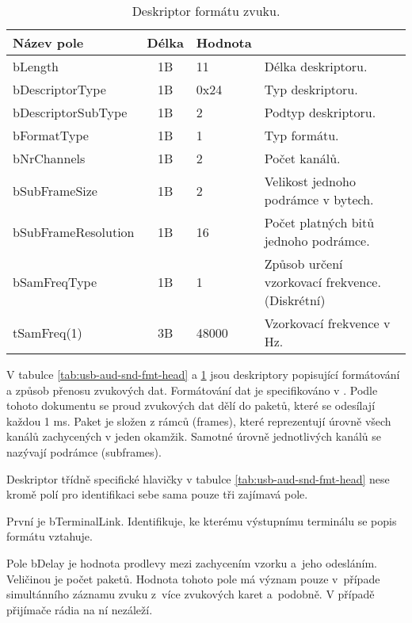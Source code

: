 \begin{table}[ht!]
\begin{center}
\begin{tabular}{|l|c|l|l|}
\hline 
Název pole & Délka & Hodnota &  \\ 
\hline
bLength & 1B & 11 & Délka deskriptoru.\\
\hline
bDescriptorType & 1B & 0x24 & Typ deskriptoru. \\
\hline
bDescriptorSubType & 1B & 2 & Podtyp deskriptoru. \\
\hline
bFormatType & 1B & 1 & Typ formátu.\\
\hline
bNrChannels & 1B & 2 & Počet kanálů.\\
\hline
bSubFrameSize & 1B & 2 & Velikost jednoho podrámce v bytech. \\ %
\hline
bSubFrameResolution & 1B & 16 & Počet platných bitů jednoho podrámce. \\
\hline 
bSamFreqType & 1B & 1 & Způsob určení vzorkovací frekvence. (Diskrétní) \\ %
\hline
tSamFreq(1) & 3B & 48000 & Vzorkovací frekvence v Hz. \\
\hline 
\end{tabular} 
\end{center}
\caption{Deskriptor formátu zvuku.}
\label{tab:usb-aud-snd-fmt} 
\end{table}

\FloatBarrier

V tabulce \ref{tab:usb-aud-snd-fmt-head} a \ref{tab:usb-aud-snd-fmt} jsou deskriptory popisující formátování a způsob přenosu zvukových dat. Formátování dat je specifikováno v \cite{usb-audio-formats}. Podle tohoto dokumentu se proud zvukových dat dělí do paketů, které se odesílají každou 1 ms. Paket je složen z rámců (frames), které reprezentují úrovně všech kanálů zachycených v jeden okamžik. Samotné úrovně jednotlivých kanálů se nazývají podrámce (subframes).

Deskriptor třídně specifické hlavičky v tabulce \ref{tab:usb-aud-snd-fmt-head} nese kromě polí pro identifikaci sebe sama pouze tři zajímavá pole. 

První je bTerminalLink. Identifikuje, ke kterému výstupnímu terminálu se popis formátu vztahuje. 

Pole bDelay je hodnota prodlevy mezi zachycením vzorku a~jeho odesláním. Veličinou je počet paketů. Hodnota tohoto pole má význam pouze v~případe simultánního záznamu zvuku z~více zvukových karet a~podobně. V případě přijímače rádia na ní nezáleží. 

